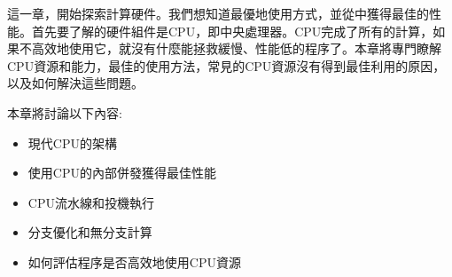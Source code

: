 這一章，開始探索計算硬件。我們想知道最優地使用方式，並從中獲得最佳的性能。首先要了解的硬件組件是CPU，即中央處理器。CPU完成了所有的計算，如果不高效地使用它，就沒有什麼能拯救緩慢、性能低的程序了。本章將專門瞭解CPU資源和能力，最佳的使用方法，常見的CPU資源沒有得到最佳利用的原因，以及如何解決這些問題。

本章將討論以下內容:

\begin{itemize}
\item 現代CPU的架構
\item 使用CPU的內部併發獲得最佳性能
\item CPU流水線和投機執行
\item 分支優化和無分支計算
\item 如何評估程序是否高效地使用CPU資源
\end{itemize}